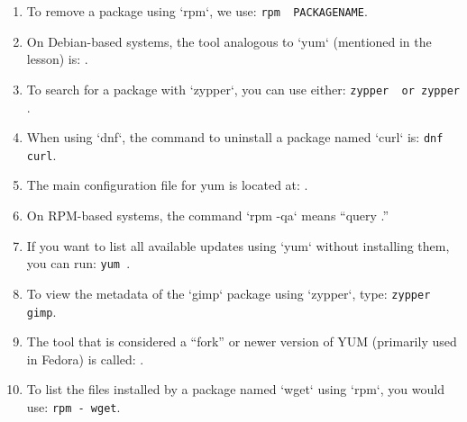 \documentclass[a4paper]{report}
\begin{document}
\begin{enumerate}[1.]

\item To remove a package using `rpm`, we use:\newline
\texttt{rpm \underline{\hspace{2cm}} PACKAGENAME}.

\item On Debian-based systems, the tool analogous to `yum` (mentioned in the lesson) is:\newline
\underline{\hspace{2cm}}.

\item To search for a package with `zypper`, you can use either:\newline
\texttt{zypper \underline{\hspace{2cm}} or zypper \underline{\hspace{2cm}}}.

\item When using `dnf`, the command to uninstall a package named `curl` is:\newline
\texttt{dnf \underline{\hspace{2cm}} curl}.

\item The main configuration file for yum is located at:
\underline{\hspace{2cm}}.

\item On RPM-based systems, the command `rpm -qa` means “query \underline{\hspace{2cm}}.”

\item If you want to list all available updates using `yum` without installing them, you can run:\newline
\texttt{yum \underline{\hspace{2cm}}}.

\item To view the metadata of the `gimp` package using `zypper`, type:\newline
\texttt{zypper \underline{\hspace{2cm}} gimp}.

\item The tool that is considered a “fork” or newer version of YUM (primarily used in Fedora) is called:
\underline{\hspace{2cm}}.

\item To list the files installed by a package named `wget` using `rpm`, you would use:\newline
\texttt{rpm -\underline{\hspace{2cm}} wget}.

\end{enumerate}
\newpage
\end{document}
